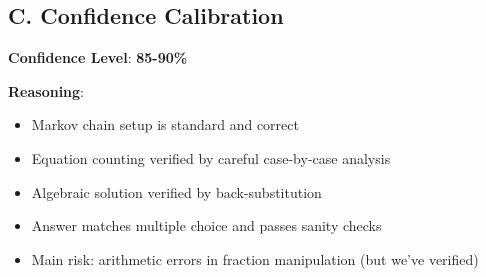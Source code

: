 \documentclass[12pt]{article}
\begin{document}
\begin{verificationbox}
\subsection*{C. Confidence Calibration}

\textbf{Confidence Level}: \textbf{85-90\%}

\textbf{Reasoning}:
\begin{itemize}[leftmargin=*]
    \item Markov chain setup is standard and correct
    \item Equation counting verified by careful case-by-case analysis
    \item Algebraic solution verified by back-substitution
    \item Answer matches multiple choice and passes sanity checks
    \item Main risk: arithmetic errors in fraction manipulation (but we've verified)
\end{itemize}

\end{verificationbox}
\end{document}
